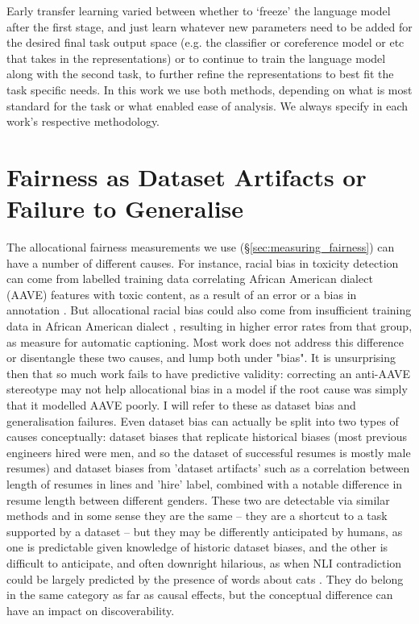 Early transfer learning varied between whether to `freeze' the language model after the first stage, and just learn whatever new parameters need to be added for the desired final task output space (e.g. the classifier or coreference model or etc that takes in the representations) or to continue to train the language model along with the second task, to further refine the representations to best fit the task specific needs.  In this work we use both methods, depending on what is most standard for the task or what enabled ease of analysis. We always specify in each work's respective methodology.  



\section{Fairness as Dataset Artifacts or Failure to Generalise}
\label{sec:fairness_as_other_fields}
The allocational fairness measurements we use (\S \ref{sec:measuring_fairness}) can have a number of different causes. For instance, racial bias in toxicity detection can come from labelled training data correlating African American dialect (AAVE) features with toxic content, as a result of an error or a bias in annotation \citep{sap-etal-2019-risk}. But allocational racial bias could also come from insufficient training data in African American dialect , resulting in higher error rates from that group, as \citet{tatman17_interspeech} measure for automatic captioning. Most work does not address this difference or disentangle these two causes, and lump both under "bias". It is unsurprising then that so much work fails to have predictive validity: correcting an anti-AAVE stereotype may not help allocational bias in a model if the root cause was simply that it modelled AAVE poorly. I will refer to these as dataset bias and generalisation failures. Even dataset bias can actually be split into two types of causes conceptually: dataset biases that replicate historical biases (most previous engineers hired were men, and so the dataset of successful resumes is mostly male resumes) and dataset biases from 'dataset artifacts' such as a correlation between length of resumes in lines and 'hire' label, combined with a notable difference in resume length between different genders. These two are detectable via similar methods and in some sense they are the same -- they are a shortcut to a task supported by a dataset -- but they may be differently anticipated by humans, as one is predictable given knowledge of historic dataset biases, and the other is difficult to anticipate, and often downright hilarious, as when NLI contradiction could be largely predicted by the presence of words about cats \citep{gururangan-etal-2018-annotation}. They do belong in the same category as far as causal effects, but the conceptual difference can have an impact on discoverability.

